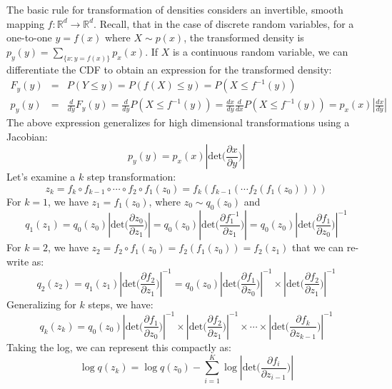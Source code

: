 The basic rule for transformation of densities considers an invertible, smooth mapping $f: \mathbb{R}^{d}\rightarrow \mathbb{R}^{d}$. Recall, that in the case of discrete random variables, for a one-to-one $y=f(x)$ where $X \sim p(x)$, the transformed density is $p_y(y) = \sum_{\{x : y = f(x)\}} p_x(x)$. If $X$ is a continuous random variable, we can differentiate the CDF to obtain an expression for the transformed density:
\begin{eqnarray}
   F_{y}(y) &=& P(Y \leq y) = P(f(X) \leq y) = P(X \leq f^{-1}(y)) \\
   p_{y}(y) &=& \frac{d}{dy}F_{y}(y) = \frac{d}{dy}P(X \leq f^{-1}(y)) = \frac{dx}{dy}\frac{d}{dx}P(X \leq f^{-1}(y)) = p_x(x)|\frac{dx}{dy}|
\end{eqnarray}
The above expression generalizes for high dimensional transformations using a Jacobian:
\begin{equation}
    p_y(y) = p_x(x)|\mathrm{det}\bigg(\frac{\partial x}{\partial y}\bigg)|
\end{equation}
Let's examine a $k$ step transformation:
\begin{equation}
    z_k = f_k \circ f_{k-1} \circ \cdots \circ f_{2} \circ f_{1} (z_0) = f_k(f_{k-1}(\cdots f_{2}(f_{1}(z_0))))
\end{equation}
For $k=1$, we have $z_1 = f_{1}(z_0)$, where $z_0 \sim q_{0}(z_0)$ and
\begin{equation}
   q_{1}(z_1) = q_{0}(z_0)|\mathrm{det}\bigg(\frac{\partial z_0}{\partial z_1}\bigg)|  = q_{0}(z_0)|\mathrm{det}\bigg(\frac{\partial f_{1}^{-1}}{\partial z_1}\bigg)| = q_{0}(z_0)|\mathrm{det}\bigg(\frac{\partial f_{1}}{\partial z_0}\bigg)|^{-1}  
\end{equation}
For $k=2$, we have $z_2 = f_2 \circ f_1 (z_0) = f_2(f_1(z_0)) = f_2(z_1)$ that we can re-write as:
\begin{equation}
    q_{2}(z_2) = q_1(z_1)|\mathrm{det}\bigg(\frac{\partial f_2}{\partial z_1} \bigg)|^{-1} =  q_{0}(z_0)|\mathrm{det}\bigg(\frac{\partial f_{1}}{\partial z_0}\bigg)|^{-1} \times |\mathrm{det}\bigg(\frac{\partial f_2}{\partial z_1} \bigg)|^{-1} 
\end{equation}
Generalizing for $k$ steps, we have:
\begin{equation}
    q_{k}(z_k) = q_{0}(z_0)|\mathrm{det}\bigg(\frac{\partial f_{1}}{\partial z_0}\bigg)|^{-1} \times |\mathrm{det}\bigg(\frac{\partial f_2}{\partial z_1} \bigg)|^{-1} \times \cdots \times |\mathrm{det}\bigg(\frac{\partial f_k}{\partial z_{k-1}}\bigg)|^{-1} 
\end{equation}
Taking the log, we can represent this compactly as:
\begin{equation}
    \log q(z_k) = \log q(z_0) - \sum_{i=1}^{K}\log|\mathrm{det}\bigg(\frac{\partial f_i}{\partial z_{i-1}}\bigg)|
\end{equation}




